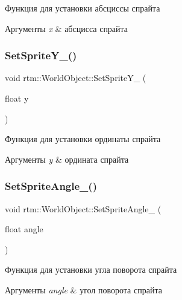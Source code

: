 Функция для установки абсциссы спрайта 
\begin{DoxyParams}{Аргументы}
{\em x} & абсцисса спрайта \\
\hline
\end{DoxyParams}
\mbox{\label{classrtm_1_1_world_object_a885eff01e5b07ef96194a868ff1fe338}} 
\subsubsection{\texorpdfstring{Set\+Sprite\+Y\+\_\+()}{SetSpriteY\_()}}
{\footnotesize\ttfamily void rtm\+::\+World\+Object\+::\+Set\+Sprite\+Y\+\_\+ (\begin{DoxyParamCaption}\item[{float}]{y }\end{DoxyParamCaption})\hspace{0.3cm}{\ttfamily [private]}}

Функция для установки ординаты спрайта 
\begin{DoxyParams}{Аргументы}
{\em y} & ордината спрайта \\
\hline
\end{DoxyParams}
\mbox{\label{classrtm_1_1_world_object_a5daee1cc41f0657f33d6790c22614f5e}} 
\subsubsection{\texorpdfstring{Set\+Sprite\+Angle\+\_\+()}{SetSpriteAngle\_()}}
{\footnotesize\ttfamily void rtm\+::\+World\+Object\+::\+Set\+Sprite\+Angle\+\_\+ (\begin{DoxyParamCaption}\item[{float}]{angle }\end{DoxyParamCaption})\hspace{0.3cm}{\ttfamily [private]}}

Функция для установки угла поворота спрайта 
\begin{DoxyParams}{Аргументы}
{\em angle} & угол поворота спрайта \\
\hline
\end{DoxyParams}
\mbox{\label{classrtm_1_1_world_object_a2a88c51a636b8b8c94320c0f6d66feb7}} 
